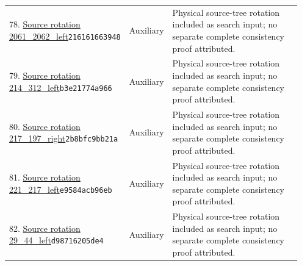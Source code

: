 \begin{longtable}{@{}p{0.27\linewidth}p{0.13\linewidth}p{0.55\linewidth}@{}}
78. \href{https://github.com/VladimirReshetnikov/ProveIt/blob/32d0d8b7d93a63ad4106c18cdb29b37927acdad2/Computability/BusyBeaver/Research/PA/docs/pa_consistency_research_2026-11-14_2/research/physical/inputs/source_programs/2061_2062_left/machine.native.tm}{Source rotation 2061\_\allowbreak{}2062\_\allowbreak{}left}\newline\texttt{216161663948} & Auxiliary & Physical source-tree rotation included as search input; no separate complete consistency proof attributed.\\[5pt]
79. \href{https://github.com/VladimirReshetnikov/ProveIt/blob/32d0d8b7d93a63ad4106c18cdb29b37927acdad2/Computability/BusyBeaver/Research/PA/docs/pa_consistency_research_2026-11-14_2/research/physical/inputs/rotations/214_312_left.tm}{Source rotation 214\_\allowbreak{}312\_\allowbreak{}left}\newline\texttt{b3e21774a966} & Auxiliary & Physical source-tree rotation included as search input; no separate complete consistency proof attributed.\\[5pt]
80. \href{https://github.com/VladimirReshetnikov/ProveIt/blob/32d0d8b7d93a63ad4106c18cdb29b37927acdad2/Computability/BusyBeaver/Research/PA/docs/pa_consistency_research_2026-11-14_2/research/physical/inputs/rotations/217_197_right.tm}{Source rotation 217\_\allowbreak{}197\_\allowbreak{}right}\newline\texttt{2b8bfc9bb21a} & Auxiliary & Physical source-tree rotation included as search input; no separate complete consistency proof attributed.\\[5pt]
81. \href{https://github.com/VladimirReshetnikov/ProveIt/blob/32d0d8b7d93a63ad4106c18cdb29b37927acdad2/Computability/BusyBeaver/Research/PA/docs/pa_consistency_research_2026-11-14_2/research/physical/inputs/rotations/221_217_left.tm}{Source rotation 221\_\allowbreak{}217\_\allowbreak{}left}\newline\texttt{e9584acb96eb} & Auxiliary & Physical source-tree rotation included as search input; no separate complete consistency proof attributed.\\[5pt]
82. \href{https://github.com/VladimirReshetnikov/ProveIt/blob/32d0d8b7d93a63ad4106c18cdb29b37927acdad2/Computability/BusyBeaver/Research/PA/docs/pa_consistency_research_2026-11-14_2/research/physical/inputs/rotations/29_44_left.tm}{Source rotation 29\_\allowbreak{}44\_\allowbreak{}left}\newline\texttt{d98716205de4} & Auxiliary & Physical source-tree rotation included as search input; no separate complete consistency proof attributed.\\[5pt]

\end{longtable}
